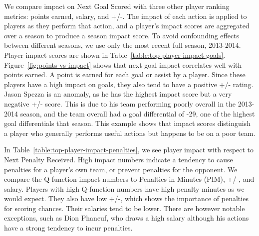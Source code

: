 \documentclass[]{article}
\begin{document}
We compare impact on Next Goal Scored with three other player ranking metrics: points earned, salary, and +/-.
The impact of each action is applied to players as they perform that action, and a player's impact scores are aggregated over a season to produce a season impact score. To avoid confounding effects between different seasons, we use only the most recent full season, 2013-2014. Player impact scores are shown in Table~\ref{table:top-player-impact-goals}. Figure~\ref{fig:points-vs-impact} shows that next goal impact correlates well with points earned. A point is earned for each goal or assist by a player.
Since these players have a high impact on goals, they also tend to have a positive +/- rating.
Jason Spezza is an anomaly, as he has the highest impact score but a very negative +/- score. This is due to his team performing poorly overall in the 2013-2014 season, and the team overall had a goal differential of -29, one of the highest goal differentials that season. This example shows that impact scores distinguish a player who generally performs useful actions but happens to be on a poor team.

In Table~\ref{table:top-player-impact-penalties}, we see player impact with respect to Next Penalty Received. High impact numbers indicate a tendency to cause penalties for a player's own team, or prevent penalties for the opponent. We compare the Q-function impact numbers to Penalties in Minutes (PIM), +/-, and salary. Players with high Q-function numbers have high penalty minutes as we would expect. They also have low +/-, which shows the importance of penalties for scoring chances. Their salaries tend to be lower. There are however notable exceptions, such as Dion Phaneuf, who draws a high salary although his actions have a strong tendency to incur penalties.
\end{document}
